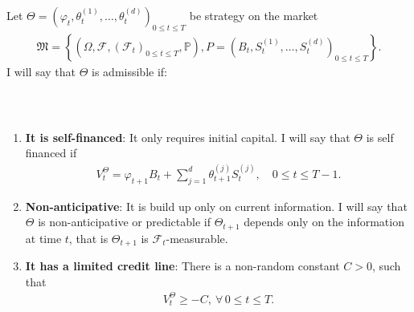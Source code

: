 \documentclass{beamer}
\numberwithin{equation}{section}
\begin{document}
\begin{frame}\frametitle{{\normalsize \secname} \\ {\large \subsecname}}
    \begin{definition}
        \begingroup
        Let $\Theta = \left(\varphi_t, \theta_t^{(1)}, \ldots, \theta_t^{(d)}\right)_{0 \leq t \leq T}$ be strategy on the market
        \begin{align}
            \mathfrak{M} =
            \left\{
                \left(
                    \Omega,
                    \mathscr{F},
                    \left(
                        \mathscr{F}_t
                    \right)_{0 \leq t \leq T},
                    \mathbb{P}
                \right),
                P =
                \left(
                    B_t,
                    S_t^{(1)},
                    \ldots,
                    S_t^{(d)}
                \right)_{0 \leq t \leq T}
            \right\}.
        \end{align}
        I will say that $\Theta$ is admissible if:
        \endgroup
    \end{definition}
\end{frame}

\begin{frame}\frametitle{{\normalsize \secname} \\ {\large \subsecname}}
    \begin{enumerate}
        \item \textbf{It is self-financed}: It only requires initial capital.
        I will say that $\Theta$ is self financed if
        \begin{align}
            V_t^{\Theta} = \varphi_{t+1}B_t + \sum_{j=1}^d \theta_{t+1}^{(j)}S_t^{(j)}, \quad 0 \leq t \leq T-1.
        \end{align}
        \item \textbf{Non-anticipative}: It is build up only on current information.
        I will say that $\Theta$ is non-anticipative or predictable if $\Theta_{t+1}$ depends only on the information at time $t$, that is $\Theta_{t+1}$ is $\mathscr{F}_t$-measurable.
        \item \textbf{It has a limited credit line}: There is a non-random constant $C > 0$, such that
        \begin{align}
            V_t^{\Theta} \geq -C, \ \forall \, 0 \leq t \leq T.
        \end{align}
    \end{enumerate}
\end{frame}
\end{document}
